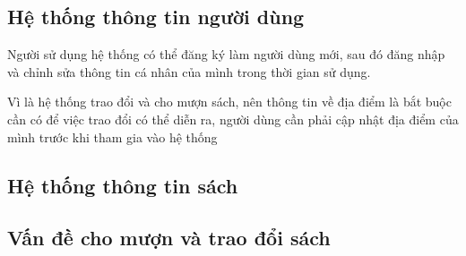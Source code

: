 \documentclass[../thesis.tex]{subfiles}
\begin{document}
	\subsection{Hệ thống thông tin người dùng}
		Người sử dụng hệ thống có thể đăng ký làm người dùng mới, sau đó đăng nhập và chỉnh sửa thông tin cá nhân của mình trong thời gian sử dụng.
		
		Vì là hệ thống trao đổi và cho mượn sách, nên thông tin về địa điểm là bắt buộc cần có để việc trao đổi có thể diễn ra, người dùng cần phải cập nhật địa điểm của mình trước khi tham gia vào hệ thống
	\subsection{Hệ thống thông tin sách}
	\subsection{Vấn đề cho mượn và trao đổi sách}
\end{document}
